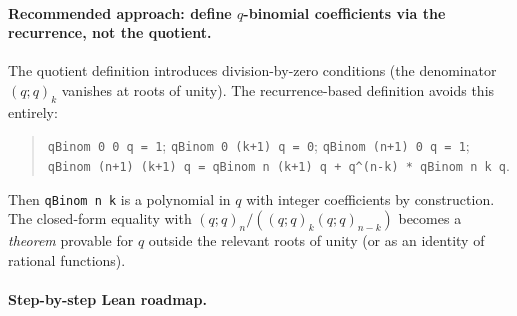 \paragraph{Recommended approach: define $q$-binomial coefficients via the recurrence, not the quotient.}
The quotient definition introduces division-by-zero conditions (the denominator $(q;q)_k$ vanishes at roots of unity). The recurrence-based definition avoids this entirely:
\begin{quote}
\texttt{qBinom 0 0 q = 1}; \texttt{qBinom 0 (k+1) q = 0}; \texttt{qBinom (n+1) 0 q = 1}; \\
\texttt{qBinom (n+1) (k+1) q = qBinom n (k+1) q + q\^{}(n-k) * qBinom n k q}.
\end{quote}
Then \texttt{qBinom n k} is a polynomial in $q$ with integer coefficients by construction. The closed-form equality with $(q;q)_n / ((q;q)_k (q;q)_{n-k})$ becomes a \emph{theorem} provable for $q$ outside the relevant roots of unity (or as an identity of rational functions).

\paragraph{Step-by-step Lean roadmap.}

